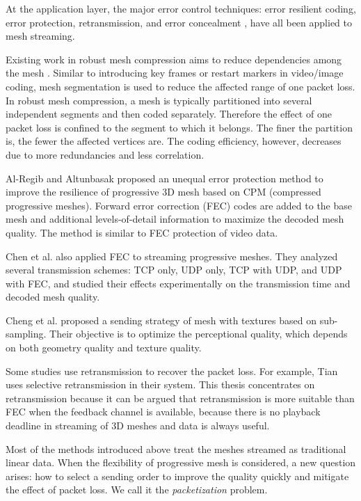     At the application layer, the major error control techniques: error
    resilient coding, error protection, retransmission, and error
    concealment \cite{Park2003}, have all been applied to mesh streaming.  
    
    Existing work in robust mesh compression aims to
    reduce dependencies among the mesh \cite{error:Park,error:Yan}.
    Similar to introducing key frames or restart markers in video/image
    coding, mesh segmentation is used to reduce the affected range of one
    packet loss. In robust mesh compression, a mesh is typically
    partitioned into several independent segments and then coded separately.
    Therefore the effect of one packet loss is confined to the segment to which
    it belongs. The finer the partition is, the fewer the affected vertices
    are.  The coding efficiency, however, decreases
    due to more redundancies and less correlation.

    Al-Regib and Altunbasak \cite{unequal:Al-Regib} proposed an
    unequal error protection method to improve the resilience of
    progressive 3D mesh based on CPM (compressed progressive meshes). 
    Forward error correction (FEC) codes are added to the
    base mesh and additional levels-of-detail information to maximize 
    the decoded mesh quality.  The method is similar to FEC protection 
    of video data.

    Chen et al. \cite{chen05hybrid} also applied FEC to streaming
    progressive meshes. They analyzed several transmission schemes:
    TCP only, UDP only, TCP with UDP, and UDP with FEC, and studied
    their effects experimentally on the transmission time and decoded
    mesh quality.

    Cheng et al. \cite{loss:cheng} proposed a sending strategy of mesh
    with textures based on sub-sampling. 
    Their objective is to optimize the perceptional quality, which depends 
    on both geometry quality and texture quality. 
    
    Some studies use retransmission to recover the packet loss.
    For example, Tian \cite{Tian2006} uses selective retransmission in their system.
    This thesis concentrates on retransmission because it can be argued that 
    retransmission is more suitable than FEC when the feedback
    channel is available, because there is no playback deadline in streaming
    of 3D meshes and data is always useful.

    Most of the methods introduced above treat the meshes streamed as 
    traditional linear data. When the flexibility of progressive mesh
    is considered, a new question arises: how to select a sending order
    to improve the quality quickly and mitigate the effect of packet loss.
    We call it the \emph{packetization} problem.
    
